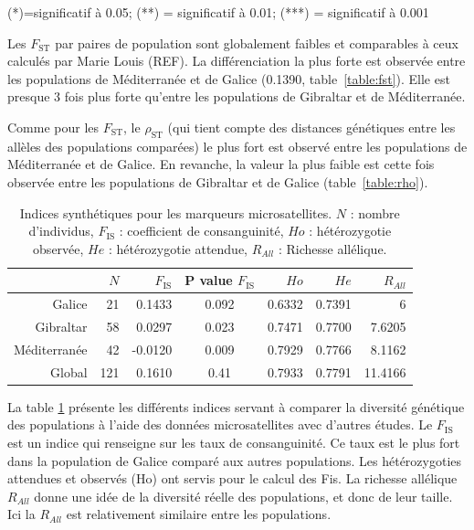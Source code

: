 \documentclass[a4paper,12pt,twoside]{article}\usepackage[]{graphicx}\usepackage[]{color}
\begin{document}
\begin {bibunit} [newbst]
\begin{table}[htpb]
\begin{center}
\begin{minipage}{.48\textwidth}
\end{minipage}
(*)=significatif à 0.05; (**) = significatif à 0.01; (***) = significatif à 0.001
\end{center}
\end{table}

Les $F_\textrm{ST}$ par paires de population sont globalement faibles et comparables à ceux calculés par Marie Louis (REF). La différenciation la plus forte est observée entre les populations de Méditerranée et de Galice (0.1390, table~\ref{table:fst}). Elle est presque 3 fois plus forte qu'entre les populations de Gibraltar et de Méditerranée.

Comme pour les $F_\textrm{ST}$, le $\rho_\textrm{ST}$ (qui tient compte des distances génétiques entre les allèles des populations comparées) le plus fort est observé entre les populations de Méditerranée et de Galice. En revanche, la valeur la plus faible est cette fois observée entre les populations de Gibraltar et de Galice (table~\ref{table:rho}).

\begin{table}[htpb]
\centering
\caption[Indices synthétiques pour les marqueurs microsatellites.\label{micro}]{Indices synthétiques pour les marqueurs microsatellites. $N$ : nombre d'individus, $F_\textrm{IS}$ : coefficient de consanguinité, $Ho$ : hétérozygotie observée, $He$ : hétérozygotie attendue, $R_{All}$ : Richesse allélique.}
\label{micro}
\begin{tabular}{rrrcrrr}
\toprule
 & $N$ & $F_\textrm{IS}$ & P value $F_\textrm{IS}$  & $Ho$ & $He$ & $R_{All}$ \\
\hline
Galice 			&	21	&	0.1433	& 0.092 &	0.6332	&	0.7391	&	6 \\
Gibraltar 		&	58	&	0.0297	& 0.023 &	0.7471	&	0.7700	&	7.6205\\
Méditerranée 	&	42	&	-0.0120	& 0.009 &	0.7929	&	0.7766	&	8.1162 \\
\midrule
Global 			&	121	&	0.1610	& 0.41 &	0.7933	&	0.7791	&	11.4166 \\
\bottomrule
\end{tabular}
\end{table}

La table \ref{micro} présente les différents indices servant à comparer la diversité génétique des populations à l'aide des données microsatellites avec d'autres études. Le $F_\textrm{IS}$ est un indice qui renseigne sur les taux de consanguinité. Ce taux est le plus fort dans la population de Galice comparé aux autres populations. Les hétérozygoties attendues et observés (Ho) ont servis pour le calcul des Fis. La richesse allélique $R_{All}$ donne une idée de la diversité réelle des populations, et donc de leur taille. Ici la $R_{All}$ est relativement similaire entre les populations.


\end{bibunit}
\end{document}
